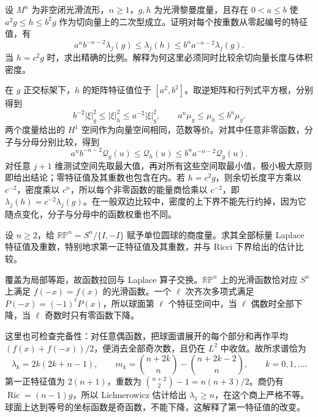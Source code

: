 \begin{exercise}\label{g3:ex:metric-comparison-eigenvalues}
	设 \(M^n\) 为非空闭光滑流形，\(n\ge1\)，\(g,h\) 为光滑黎曼度量，且存在 \(0<a\le b\) 使
	\(a^2g\le h\le b^2g\) 作为切向量上的二次型成立。证明对每个按重数从零起编号的特征值，有
	\[
		a^n b^{-n-2}\lambda_j(g)
		\le\lambda_j(h)
		\le b^n a^{-n-2}\lambda_j(g).
	\]
	当 \(h=c^2g\) 时，求出精确的比例。解释为何这里必须同时比较余切向量长度与体积密度。
\end{exercise}
\begin{solution}
	在 \(g\) 正交标架下，\(h\) 的矩阵特征值位于 \([a^2,b^2]\)。取逆矩阵和行列式平方根，分别得到
	\[
		b^{-2}|\xi|_g^2\le|\xi|_h^2\le a^{-2}|\xi|_g^2,
		\qquad a^n\mu_g\le\mu_h\le b^n\mu_g.
	\]
	两个度量给出的 \(H^1\) 空间作为向量空间相同，范数等价。对其中任意非零函数，分子与分母分别比较，得到
	\[
		a^n b^{-n-2}\mathscr Q_g(u)
		\le\mathscr Q_h(u)
		\le b^n a^{-n-2}\mathscr Q_g(u).
	\]
	对任意 \(j+1\) 维测试空间先取最大值，再对所有这些空间取最小值，极小极大原则即给出结论；零特征值及其重数也包含在内。若 \(h=c^2g\)，则余切长度平方乘以 \(c^{-2}\)，密度乘以 \(c^n\)，所以每个非零函数的能量商恰乘以 \(c^{-2}\)，即 \(\lambda_j(h)=c^{-2}\lambda_j(g)\)。在一般双边比较中，密度的上下界不能先行约掉，因为它随点变化，分子与分母中的函数权重也不同。
\end{solution}

\begin{exercise}\label{g3:ex:projective-space-scalar-spectrum}
	设 \(n\ge2\)，给 \(\mathbb{RP}^n=S^n/\{I,-I\}\) 赋予单位圆球的商度量。求其全部标量 Laplace 特征值及重数，特别地求第一正特征值及其重数，并与 Ricci 下界给出的估计比较。
\end{exercise}
\begin{solution}
	覆盖为局部等距，故函数拉回与 Laplace 算子交换。\(\mathbb{RP}^n\) 上的光滑函数恰对应 \(S^n\) 上满足 \(f(-x)=f(x)\) 的光滑函数。一个 \(\ell\) 次齐次多项式满足 \(P(-x)=(-1)^\ell P(x)\)，所以球面第 \(\ell\) 个特征空间中，当 \(\ell\) 偶数时全部下降，当 \(\ell\) 奇数时只有零函数下降。

	这里也可检查完备性：对任意偶函数，把球面谱展开的每个部分和再作平均 \((f(x)+f(-x))/2\)，便消去全部奇次数，且仍在 \(L^2\) 中收敛。故所求谱恰为
	\[
		\lambda_k=2k(2k+n-1),\qquad
		m_k=\binom{n+2k}{n}-\binom{n+2k-2}{n},
		\qquad k=0,1,\ldots.
	\]
	第一正特征值为 \(2(n+1)\)，重数为
	\(\binom{n+2}{2}-1=n(n+3)/2\)。商仍有 \(\operatorname{Ric}=(n-1)g\)，所以 Lichnerowicz 估计给出 \(\lambda_1\ge n\)，在这个商上严格不等。球面上达到等号的坐标函数是奇函数，不能下降，这解释了第一特征值的改变。
\end{solution}

